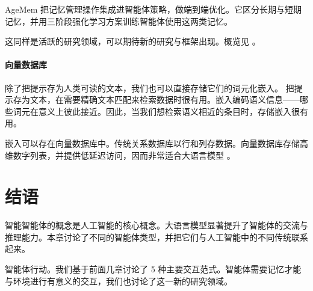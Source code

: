 AgeMem \citep{yu2026agentic} 把记忆管理操作集成进智能体策略，做端到端优化。它区分长期与短期记忆，并用三阶段强化学习方案训练智能体使用这两类记忆。

这同样是活跃的研究领域，可以期待新的研究与框架出现。概览见 \citet{zhou2026we}。


\paragraph{向量数据库}
除了把提示存为人类可读的文本，我们也可以直接存储它们的词元化嵌入。
把提示存为文本，在需要精确文本匹配来检索数据时很有用。嵌入编码语义信息——哪些词元在意义上彼此接近。因此，当我们想检索语义相近的条目时，存储嵌入很有用。

嵌入可以存在向量数据库中。传统关系数据库以行和列存数据。向量数据库存储高维数字列表，并提供低延迟访问，因而非常适合大语言模型 \citep{xie2023brief,ma2023comprehensive}。


\section{结语}
智能智能体的概念是人工智能的核心概念。大语言模型显著提升了智能体的交流与推理能力。本章讨论了不同的智能体类型，并把它们与人工智能中的不同传统联系起来。

智能体行动。我们基于前面几章讨论了 5 种主要交互范式。智能体需要记忆才能与环境进行有意义的交互，我们也讨论了这一新的研究领域。

